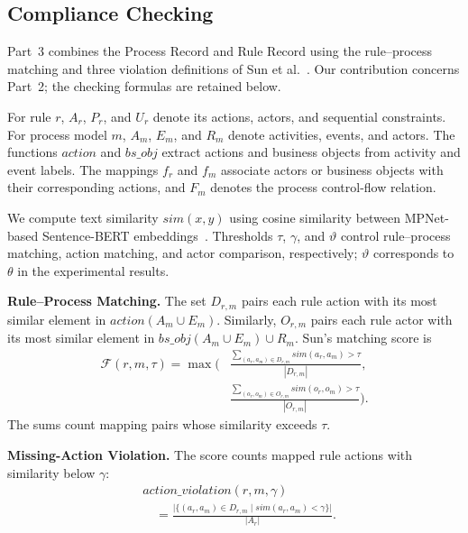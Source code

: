 \subsection{Compliance Checking}
\label{sec:3.3}

Part~3 combines the Process Record and Rule Record using the rule--process matching and three violation definitions of Sun et al.~\cite{sun2024design}. Our contribution concerns Part~2; the checking formulas are retained below.

For rule \(r\), \(A_r\), \(P_r\), and \(U_r\) denote its actions, actors, and sequential constraints. For process model \(m\), \(A_m\), \(E_m\), and \(R_m\) denote activities, events, and actors. The functions \(action\) and \(\mathit{bs\_obj}\) extract actions and business objects from activity and event labels. The mappings \(f_r\) and \(f_m\) associate actors or business objects with their corresponding actions, and \(F_m\) denotes the process control-flow relation.

We compute text similarity \(sim(x,y)\) using cosine similarity between MPNet-based Sentence-BERT embeddings~\cite{reimers2019sentence,song2020mpnet}. Thresholds \(\tau\), \(\gamma\), and \(\vartheta\) control rule--process matching, action matching, and actor comparison, respectively; \(\vartheta\) corresponds to \(\theta\) in the experimental results.

\textbf{Rule--Process Matching.}
The set \(D_{r,m}\) pairs each rule action with its most similar element in \(action(A_m\cup E_m)\). Similarly, \(O_{r,m}\) pairs each rule actor with its most similar element in \(\mathit{bs\_obj}(A_m\cup E_m)\cup R_m\). Sun's matching score is
\begin{equation}
\begin{aligned}
\mathcal{F}(r,m,\tau)
=\max\Biggl(
&\frac{\displaystyle\sum_{(a_r,a_m)\in D_{r,m}}
sim(a_r,a_m)>\tau}{|D_{r,m}|},\\[2pt]
&\frac{\displaystyle\sum_{(o_r,o_m)\in O_{r,m}}
sim(o_r,o_m)>\tau}{|O_{r,m}|}
\Biggr).
\end{aligned}
\label{eq:matching}
\end{equation}
The sums count mapping pairs whose similarity exceeds \(\tau\).

\textbf{Missing-Action Violation.}
The score counts mapped rule actions with similarity below \(\gamma\):
\begin{equation}
\begin{aligned}
&\mathit{action\_violation}(r,m,\gamma)\\
&\quad=
\frac{\bigl|\{(a_r,a_m)\in D_{r,m}
\mid sim(a_r,a_m)<\gamma\}\bigr|}{|A_r|}.
\end{aligned}
\label{eq:missing}
\end{equation}

